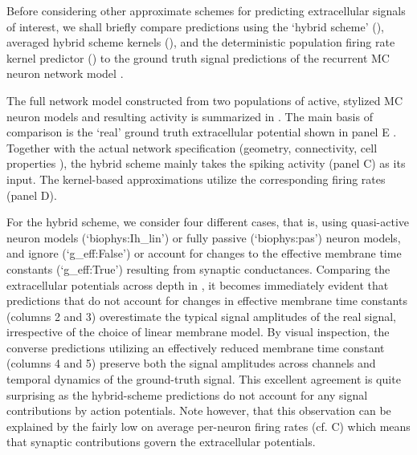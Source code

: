 Before considering other approximate schemes for predicting extracellular signals of interest, 
we shall briefly compare predictions using the `hybrid scheme' (),
averaged hybrid scheme kernels (),
and the deterministic population firing rate kernel predictor () to the ground truth signal predictions of the recurrent MC neuron network model 
. 

The full network model constructed from two populations of active, stylized MC neuron models and resulting activity is summarized in . 
The main basis of comparison is the `real' ground truth extracellular potential shown in panel E 
. 
Together with the actual network specification (geometry, connectivity, cell properties ), 
the hybrid scheme mainly takes the spiking activity (panel C) as its input. 
The kernel-based approximations utilize the corresponding firing rates (panel D). 

For the hybrid scheme, 
we consider four different cases, that is, using quasi-active neuron models (`biophys:Ih\_lin') or fully passive (`biophys:pas') neuron models, 
and ignore (`g\_eff:False') or account for changes to the effective membrane time constants (`g\_eff:True') resulting from synaptic conductances.  
Comparing the extracellular potentials across depth in ,
it becomes immediately evident that predictions that do not account for changes in effective membrane time constants (columns 2 and 3) overestimate the typical signal amplitudes of the real signal, 
irrespective of the choice of linear membrane model. 
By visual inspection, the converse predictions utilizing an effectively reduced membrane time constant (columns 4 and 5) preserve both the signal amplitudes across channels and temporal dynamics of the ground-truth signal. 
This excellent agreement is quite surprising as the hybrid-scheme predictions do not account for any signal contributions by action potentials. 
Note however, that this observation can be explained by the fairly low on average per-neuron firing rates (cf. C) which means that synaptic contributions govern the extracellular potentials. 

